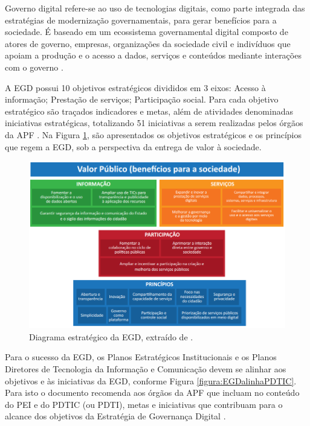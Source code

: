 \begin{citacao}
Governo digital refere-se ao uso de tecnologias digitais, como parte integrada das estratégias de modernização governamentais, para gerar benefícios para a sociedade. É baseado em um ecossistema governamental digital composto de atores de governo, empresas, organizações da sociedade civil e indivíduos que apoiam a produção e o acesso a dados, serviços e conteúdos mediante interações com o governo \cite{egd:16}.
\end{citacao}

A EGD possui 10 objetivos estratégicos divididos em 3 eixos: Acesso à informação; Prestação de serviços; Participação social. Para cada objetivo estratégico são traçados indicadores e metas, além de atividades denominadas iniciativas estratégicas, totalizando 51 iniciativas a serem realizadas pelos órgãos da APF \cite{egd:16}. Na Figura \ref{figura:egdDiagramaEstrategico}, são apresentados os objetivos estratégicos e os princípios que regem a EGD, sob a perspectiva da entrega de valor à sociedade.

\begin{figure}[h!]
\centering %
\includegraphics[width=14cm]{figuras/egdDiagramaEstrategico.png}
\caption{Diagrama estratégico da EGD, extraído de \cite{egd:16}.}
\label{figura:egdDiagramaEstrategico}
\end{figure}

Para o sucesso da EGD, os Planos Estratégicos Institucionais e os Planos Diretores de Tecnologia da Informação e Comunicação devem se alinhar aos objetivos e às iniciativas da EGD, conforme Figura \ref{figura:EGDalinhaPDTIC}. Para isto o documento recomenda aos órgãos da APF que incluam no conteúdo do PEI e do PDTIC (ou PDTI), metas e iniciativas que contribuam para o alcance dos objetivos da Estratégia de Governança Digital \cite{egd:16}.

